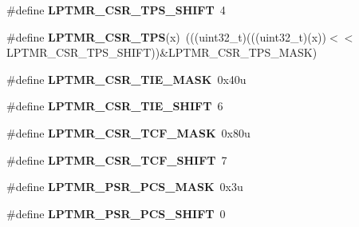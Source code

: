 \begin{DoxyCompactItemize}
\item 
\#define {\bfseries L\+P\+T\+M\+R\+\_\+\+C\+S\+R\+\_\+\+T\+P\+S\+\_\+\+S\+H\+I\+FT}~4\hypertarget{group__LPTMR__Register__Masks_ga7759d842742bfedd91788d41ef12fb8d}{}\label{group__LPTMR__Register__Masks_ga7759d842742bfedd91788d41ef12fb8d}

\item 
\#define {\bfseries L\+P\+T\+M\+R\+\_\+\+C\+S\+R\+\_\+\+T\+PS}(x)~(((uint32\+\_\+t)(((uint32\+\_\+t)(x))$<$$<$L\+P\+T\+M\+R\+\_\+\+C\+S\+R\+\_\+\+T\+P\+S\+\_\+\+S\+H\+I\+FT))\&L\+P\+T\+M\+R\+\_\+\+C\+S\+R\+\_\+\+T\+P\+S\+\_\+\+M\+A\+SK)\hypertarget{group__LPTMR__Register__Masks_ga21ce2f3d05c087f7f46dcb9b7035e4f2}{}\label{group__LPTMR__Register__Masks_ga21ce2f3d05c087f7f46dcb9b7035e4f2}

\item 
\#define {\bfseries L\+P\+T\+M\+R\+\_\+\+C\+S\+R\+\_\+\+T\+I\+E\+\_\+\+M\+A\+SK}~0x40u\hypertarget{group__LPTMR__Register__Masks_gabb726cb43d5f6ee38339048c69a5f086}{}\label{group__LPTMR__Register__Masks_gabb726cb43d5f6ee38339048c69a5f086}

\item 
\#define {\bfseries L\+P\+T\+M\+R\+\_\+\+C\+S\+R\+\_\+\+T\+I\+E\+\_\+\+S\+H\+I\+FT}~6\hypertarget{group__LPTMR__Register__Masks_gaaedba0195b3abfcae6e8669f84f39d5d}{}\label{group__LPTMR__Register__Masks_gaaedba0195b3abfcae6e8669f84f39d5d}

\item 
\#define {\bfseries L\+P\+T\+M\+R\+\_\+\+C\+S\+R\+\_\+\+T\+C\+F\+\_\+\+M\+A\+SK}~0x80u\hypertarget{group__LPTMR__Register__Masks_ga13b5dd6085ca2a8cf0f06550b7557b6b}{}\label{group__LPTMR__Register__Masks_ga13b5dd6085ca2a8cf0f06550b7557b6b}

\item 
\#define {\bfseries L\+P\+T\+M\+R\+\_\+\+C\+S\+R\+\_\+\+T\+C\+F\+\_\+\+S\+H\+I\+FT}~7\hypertarget{group__LPTMR__Register__Masks_ga0ffa48fac670327deffc2e17ef1dea68}{}\label{group__LPTMR__Register__Masks_ga0ffa48fac670327deffc2e17ef1dea68}

\item 
\#define {\bfseries L\+P\+T\+M\+R\+\_\+\+P\+S\+R\+\_\+\+P\+C\+S\+\_\+\+M\+A\+SK}~0x3u\hypertarget{group__LPTMR__Register__Masks_ga40daa10db43ec0c0a1944e6289ca29cc}{}\label{group__LPTMR__Register__Masks_ga40daa10db43ec0c0a1944e6289ca29cc}

\item 
\#define {\bfseries L\+P\+T\+M\+R\+\_\+\+P\+S\+R\+\_\+\+P\+C\+S\+\_\+\+S\+H\+I\+FT}~0\hypertarget{group__LPTMR__Register__Masks_gaf258bce874ad60601d6d76cefc72c52e}{}\label{group__LPTMR__Register__Masks_gaf258bce874ad60601d6d76cefc72c52e}


\end{DoxyCompactItemize}
